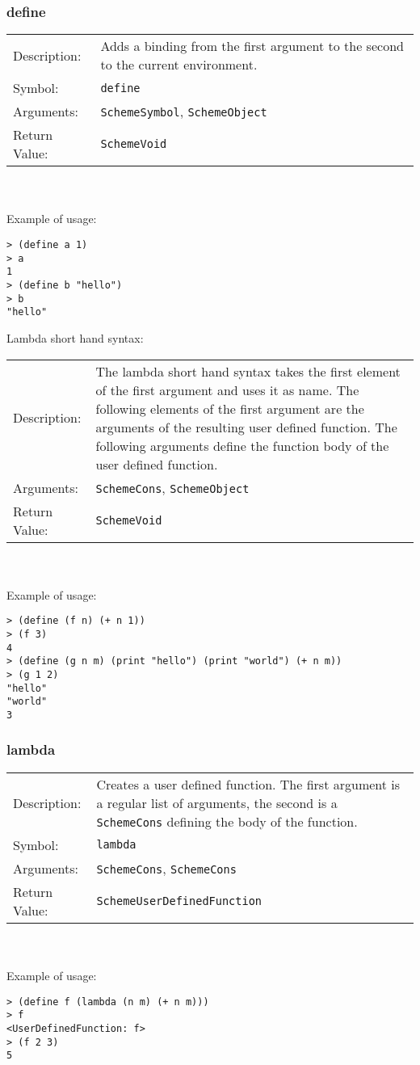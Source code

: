 \documentclass[12pt,a4paper]{scrartcl}
\begin{document}
\subsubsection{define}
\begin{tabular}{l  p{13cm}}
Description: & Adds a binding from the first argument to the second to the current environment.\\
Symbol: & \lstinline{define}\\
Arguments: & \lstinline{SchemeSymbol}, \lstinline{SchemeObject}\\
Return Value: & \lstinline{SchemeVoid}\\
\end{tabular}
\\
\\
Example of usage:
\begin{lstlisting}
> (define a 1)
> a
1
> (define b "hello")
> b
"hello"
\end{lstlisting}

Lambda short hand syntax:\\
\begin{tabular}{l  p{13cm}}
Description: & The lambda short hand syntax takes the first element of the first argument and uses it as name. The following elements of the first argument are the arguments of the resulting user defined function. The following arguments define the function body of the user defined function.\\
Arguments: & \lstinline{SchemeCons}, \lstinline{SchemeObject}\\
Return Value: & \lstinline{SchemeVoid}\\
\end{tabular}\\
\\
Example of usage:
\begin{lstlisting}
> (define (f n) (+ n 1))
> (f 3)
4
> (define (g n m) (print "hello") (print "world") (+ n m))
> (g 1 2)
"hello"
"world"
3
\end{lstlisting}

\subsubsection{lambda}
\begin{tabular}{l  p{13cm}}
Description: & Creates a user defined function. The first argument is a regular list of arguments, the second is a \lstinline{SchemeCons} defining the body of the function.\\
Symbol: & \lstinline{lambda}\\
Arguments: & \lstinline{SchemeCons}, \lstinline{SchemeCons}\\
Return Value: & \lstinline{SchemeUserDefinedFunction}\\
\end{tabular}
\\
\\
Example of usage:
\begin{lstlisting}
> (define f (lambda (n m) (+ n m)))
> f
<UserDefinedFunction: f> 
> (f 2 3)
5
\end{lstlisting}
\end{document}
